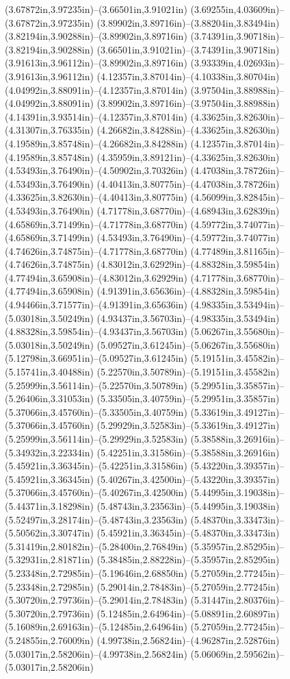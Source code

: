 (3.67872in,3.97235in)--(3.66501in,3.91021in) (3.69255in,4.03609in)--(3.67872in,3.97235in) (3.89902in,3.89716in)--(3.88204in,3.83494in) (3.82194in,3.90288in)--(3.89902in,3.89716in) (3.74391in,3.90718in)--(3.82194in,3.90288in) (3.66501in,3.91021in)--(3.74391in,3.90718in) (3.91613in,3.96112in)--(3.89902in,3.89716in) (3.93339in,4.02693in)--(3.91613in,3.96112in) (4.12357in,3.87014in)--(4.10338in,3.80704in) (4.04992in,3.88091in)--(4.12357in,3.87014in) (3.97504in,3.88988in)--(4.04992in,3.88091in) (3.89902in,3.89716in)--(3.97504in,3.88988in) (4.14391in,3.93514in)--(4.12357in,3.87014in) (4.33625in,3.82630in)--(4.31307in,3.76335in) (4.26682in,3.84288in)--(4.33625in,3.82630in) (4.19589in,3.85748in)--(4.26682in,3.84288in) (4.12357in,3.87014in)--(4.19589in,3.85748in) (4.35959in,3.89121in)--(4.33625in,3.82630in) (4.53493in,3.76490in)--(4.50902in,3.70326in) (4.47038in,3.78726in)--(4.53493in,3.76490in) (4.40413in,3.80775in)--(4.47038in,3.78726in) (4.33625in,3.82630in)--(4.40413in,3.80775in) (4.56099in,3.82845in)--(4.53493in,3.76490in) (4.71778in,3.68770in)--(4.68943in,3.62839in) (4.65869in,3.71499in)--(4.71778in,3.68770in) (4.59772in,3.74077in)--(4.65869in,3.71499in) (4.53493in,3.76490in)--(4.59772in,3.74077in) (4.74626in,3.74875in)--(4.71778in,3.68770in) (4.77489in,3.81165in)--(4.74626in,3.74875in) (4.83012in,3.62929in)--(4.88328in,3.59854in) (4.77494in,3.65908in)--(4.83012in,3.62929in) (4.71778in,3.68770in)--(4.77494in,3.65908in) (4.91391in,3.65636in)--(4.88328in,3.59854in) (4.94466in,3.71577in)--(4.91391in,3.65636in) (4.98335in,3.53494in)--(5.03018in,3.50249in) (4.93437in,3.56703in)--(4.98335in,3.53494in) (4.88328in,3.59854in)--(4.93437in,3.56703in) (5.06267in,3.55680in)--(5.03018in,3.50249in) (5.09527in,3.61245in)--(5.06267in,3.55680in) (5.12798in,3.66951in)--(5.09527in,3.61245in) (5.19151in,3.45582in)--(5.15741in,3.40488in) (5.22570in,3.50789in)--(5.19151in,3.45582in) (5.25999in,3.56114in)--(5.22570in,3.50789in) (5.29951in,3.35857in)--(5.26406in,3.31053in) (5.33505in,3.40759in)--(5.29951in,3.35857in) (5.37066in,3.45760in)--(5.33505in,3.40759in) (5.33619in,3.49127in)--(5.37066in,3.45760in) (5.29929in,3.52583in)--(5.33619in,3.49127in) (5.25999in,3.56114in)--(5.29929in,3.52583in) (5.38588in,3.26916in)--(5.34932in,3.22334in) (5.42251in,3.31586in)--(5.38588in,3.26916in) (5.45921in,3.36345in)--(5.42251in,3.31586in) (5.43220in,3.39357in)--(5.45921in,3.36345in) (5.40267in,3.42500in)--(5.43220in,3.39357in) (5.37066in,3.45760in)--(5.40267in,3.42500in) (5.44995in,3.19038in)--(5.44371in,3.18298in) (5.48743in,3.23563in)--(5.44995in,3.19038in) (5.52497in,3.28174in)--(5.48743in,3.23563in) (5.48370in,3.33473in)--(5.50562in,3.30747in) (5.45921in,3.36345in)--(5.48370in,3.33473in) (5.31419in,2.80182in)--(5.28400in,2.76849in) (5.35957in,2.85295in)--(5.32931in,2.81871in) (5.38485in,2.88228in)--(5.35957in,2.85295in) (5.23348in,2.72985in)--(5.19646in,2.68850in) (5.27059in,2.77245in)--(5.23348in,2.72985in) (5.29014in,2.78483in)--(5.27059in,2.77245in) (5.30720in,2.79736in)--(5.29014in,2.78483in) (5.31447in,2.80376in)--(5.30720in,2.79736in) (5.12485in,2.64964in)--(5.08891in,2.60897in) (5.16089in,2.69163in)--(5.12485in,2.64964in) (5.27059in,2.77245in)--(5.24855in,2.76009in) (4.99738in,2.56824in)--(4.96287in,2.52876in) (5.03017in,2.58206in)--(4.99738in,2.56824in) (5.06069in,2.59562in)--(5.03017in,2.58206in) 